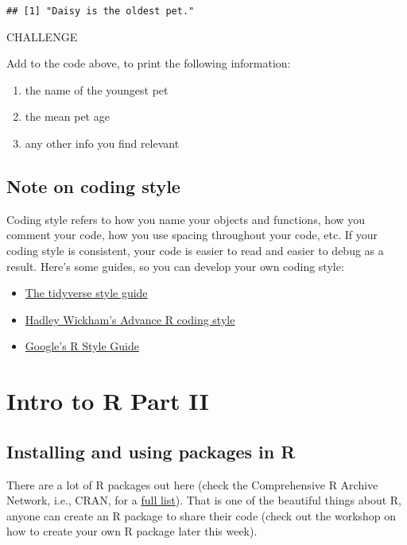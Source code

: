 \documentclass[]{book}
\begin{document}
\begin{verbatim}
## [1] "Daisy is the oldest pet."
\end{verbatim}

\leavevmode\hypertarget{challenge}{}%
CHALLENGE

Add to the code above, to print the following information:

\begin{enumerate}
\def\labelenumi{\arabic{enumi}.}
\item
  the name of the youngest pet
\item
  the mean pet age
\item
  any other info you find relevant
\end{enumerate}

\hypertarget{note-on-coding-style}{%
\section{Note on coding style}\label{note-on-coding-style}}

Coding style refers to how you name your objects and functions, how you comment your code, how you use spacing throughout your code, etc. If your coding style is consistent, your code is easier to read and easier to debug as a result. Here's some guides, so you can develop your own coding style:

\begin{itemize}
\item
  \href{https://style.tidyverse.org}{The tidyverse style guide}
\item
  \href{http://adv-r.had.co.nz/Style.html}{Hadley Wickham's Advance R coding style}
\item
  \href{https://google.github.io/styleguide/Rguide.html}{Google's R Style Guide}
\end{itemize}

\hypertarget{partii}{%
\chapter{Intro to R Part II}\label{partii}}

\hypertarget{installing-and-using-packages-in-r}{%
\section{Installing and using packages in R}\label{installing-and-using-packages-in-r}}

There are a lot of R packages out here (check the Comprehensive R Archive Network, i.e., CRAN, for a \href{https://cran.r-project.org/web/packages/available_packages_by_name.html}{full list}). That is one of the beautiful things about R, anyone can create an R package to share their code (check out the workshop on how to create your own R package later this week).
\end{document}
